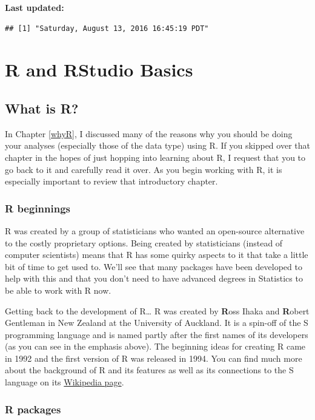 \documentclass[]{tufte-book}
\begin{document}
\textbf{Last updated:}

\begin{verbatim}
## [1] "Saturday, August 13, 2016 16:45:19 PDT"
\end{verbatim}

\chapter{R and RStudio Basics}\label{rstudiobasics}

\section{What is R?}\label{what-is-r}

In Chapter \ref{whyR}, I discussed many of the reasons why you should be
doing your analyses (especially those of the data type) using R. If you
skipped over that chapter in the hopes of just hopping into learning
about R, I request that you to go back to it and carefully read it over.
As you begin working with R, it is especially important to review that
introductory chapter.

\subsection{R beginnings}\label{r-beginnings}

R was created by a group of statisticians who wanted an open-source
alternative to the costly proprietary options. Being created by
statisticians (instead of computer scientists) means that R has some
quirky aspects to it that take a little bit of time to get used to.
We'll see that many packages have been developed to help with this and
that you don't need to have advanced degrees in Statistics to be able to
work with R now.

Getting back to the development of R\ldots{} R was created by
\textbf{R}oss Ihaka and \textbf{R}obert Gentleman in New Zealand at the
University of Auckland. It is a spin-off of the S programming language
and is named partly after the first names of its developers (as you can
see in the emphasis above). The beginning ideas for creating R came in
1992 and the first version of R was released in 1994. You can find much
more about the background of R and its features as well as its
connections to the S language on its
\href{https://en.wikipedia.org/wiki/R_(programming_language)}{Wikipedia
page}.

\subsection{R packages}\label{r-packages}
\end{document}
